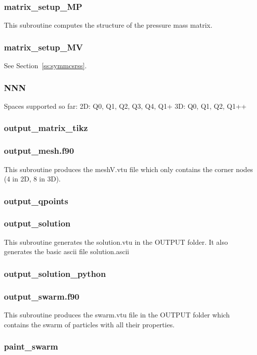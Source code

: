  \subsubsection{matrix\_setup\_MP}
 This subroutine computes the structure of the pressure mass matrix. 
 \subsubsection{matrix\_setup\_MV}
 See Section~\ref{ss:symmcsrss}. 
 \subsubsection{NNN}
 Spaces supported so far:
 2D: Q0, Q1, Q2, Q3, Q4, Q1+
 3D: Q0, Q1, Q2, Q1++
 \subsubsection{output\_matrix\_tikz}

 \subsubsection{output\_mesh.f90}
 This subroutine produces the {\filenamefont meshV.vtu} file which only 
 contains the corner nodes (4 in 2D, 8 in 3D).
 \subsubsection{output\_qpoints}

 \subsubsection{output\_solution}
 This subroutine generates the {\filenamefont solution.vtu} in the {\foldernamefont OUTPUT}
 folder. It also generates the basic ascii file {\filenamefont solution.ascii}
 \subsubsection{output\_solution\_python}

 \subsubsection{output\_swarm.f90}
 This subroutine produces the {\filenamefont swarm.vtu} file in the 
 {\foldernamefont OUTPUT} folder which contains the 
 swarm of particles with all their properties.
 \subsubsection{paint\_swarm}
 
